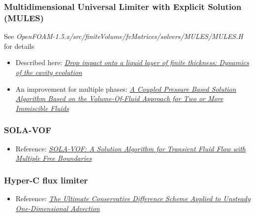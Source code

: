 \documentclass[]{report}
\begin{document}
\subsubsection{Multidimensional Universal Limiter with Explicit Solution (MULES)}

See \textit{OpenFOAM-1.5.x/src/finiteVolume/fvMatrices/solvers/MULES/MULES.H} for details


\begin{itemize}
    \item Described here: \textit{\href{http://link.libris.kb.se/sfxliub?sid=?url_ver=Z39.88-2004&rfr_id=info:sid/bibl.liu.se\%3Axerxes+\%28+PubMed+LiU\%29&rft.genre=article&rft_val_fmt=info\%3Aofi\%2Ffmt\%3Akev\%3Amtx\%3Ajournal&rft.issn=15393755&rft.date=2009&rft.jtitle=Phys+Rev+E+Stat+Nonlin+Soft+Matter+Phys&rft.volume=79&rft.issue=3+Pt+2&rft.spage=036306&rft.atitle=Drop+impact+onto+a+liquid+layer+of+finite+thickness+\%3A+dynamics+of+the+cavity+evolution+&rft.aulast=Berberovi\%C4\%87&rft.aufirst=Edin}{Drop impact onto a liquid layer of finite thickness: Dynamics of the cavity evolution}}
    \item An improvement for multiple phases: \textit{\href{http://www.mathematik.uni-ulm.de/numerik/staff/urban/reports/ECCOMASCFD2010paperfinal.pdf}{A Coupled Pressure Based Solution Algorithm Based on the Volume-Of-Fluid Approach for Two or More Immiscible Fluids}}
\end{itemize}

\subsubsection{SOLA-VOF}

\begin{itemize}
    \item Reference: \textit{\href{http://www.ewp.rpi.edu/hartford/~ernesto/Su2012/CFD/Readings/SOLA-VOF-1980-P1.pdf}{SOLA-VOF: A Solution Algorithm for Transient Fluid Flow with Multiple Free Boundaries}}
\end{itemize}

\subsubsection{Hyper-C flux limiter}

\begin{itemize}
    \item Reference: \textit{\href{http://www.water.tkk.fi/wr/kurssit/Yhd-12.112/TVD1.pdf}{The Ultimate Conservative Difference Scheme Applied to Unsteady One-Dimensional Advection}}
\end{itemize}
\end{document}
